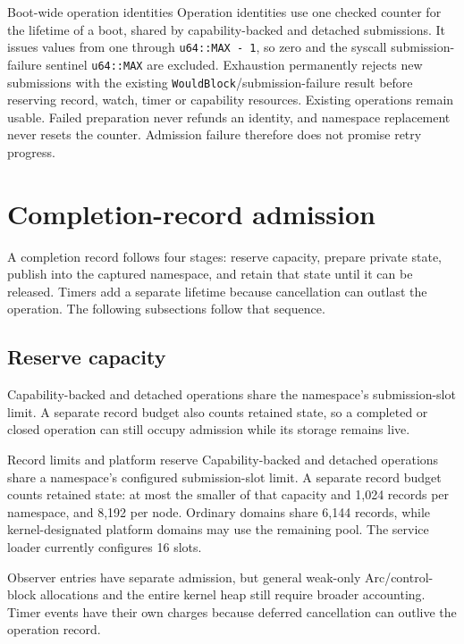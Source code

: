 \begin{implementationdetail}{Boot-wide operation identities}
Operation identities use one checked counter for the lifetime of a boot, shared
by capability-backed and detached submissions. It issues values from one through
\texttt{u64::MAX - 1}, so zero and the syscall submission-failure sentinel
\texttt{u64::MAX} are excluded. Exhaustion permanently rejects new submissions
with the existing \texttt{WouldBlock}/submission-failure result before reserving
record, watch, timer or capability resources. Existing operations remain usable.
Failed preparation never refunds an identity, and namespace replacement never
resets the counter. Admission failure therefore does not promise retry progress.
\end{implementationdetail}

\section{Completion-record admission}

A completion record follows four stages: reserve capacity, prepare private
state, publish into the captured namespace, and retain that state until it can
be released. Timers add a separate lifetime because cancellation can outlast
the operation. The following subsections follow that sequence.

\subsection{Reserve capacity}

Capability-backed and detached operations share the namespace's submission-slot
limit. A separate record budget also counts retained state, so a completed or
closed operation can still occupy admission while its storage remains live.

\begin{implementationdetail}{Record limits and platform reserve}
Capability-backed and detached operations share a namespace's configured
submission-slot limit. A separate record budget counts retained state: at most
the smaller of that capacity and 1,024 records per namespace, and 8,192 per
node. Ordinary domains share 6,144 records, while kernel-designated platform domains
may use the remaining pool. The service loader currently configures 16 slots.
\end{implementationdetail}

Observer entries have separate admission, but general weak-only Arc/control-block
allocations and the entire kernel heap still require broader accounting.
Timer events have their own charges because deferred
cancellation can outlive the operation record.


